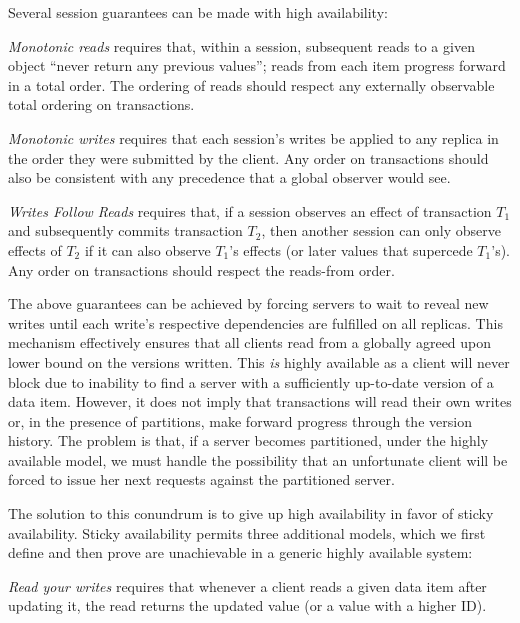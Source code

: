 Several session guarantees can be made with high availability:

\vspace{.5em}\noindent\textit{{Monotonic reads}} requires that, within
a session, subsequent reads to a given object ``never return any
previous values''; reads from each item progress forward in a total
order. The ordering of reads should respect any externally observable
total ordering on transactions.

\vspace{.5em}\noindent\textit{{Monotonic writes}} requires that each
session's writes be applied to any replica in the order they were
submitted by the client. Any order on transactions should also be
consistent with any precedence that a global observer would see.

\vspace{.5em}\noindent\textit{{Writes Follow Reads}} requires that, if
a session observes an effect of transaction $T_1$ and subsequently
commits transaction $T_2$, then another session can only observe
effects of $T_2$ if it can also observe $T_1$'s effects (or later
values that supercede $T_1$'s).  Any order on transactions should
respect the reads-from order.\vspace{.5em}

The above guarantees can be achieved by forcing servers to wait to
reveal new writes until each write's respective dependencies are
fulfilled on all replicas. This mechanism effectively ensures that all
clients read from a globally agreed upon lower bound on the versions
written. This \textit{is} highly available as a client
will never block due to inability to find a server with a sufficiently
up-to-date version of a data item. However, it does not imply that
transactions will read their own writes or, in the presence of
partitions, make forward progress through the version history. The
problem is that, if a server becomes partitioned, under the highly
available model, we must handle the possibility that an unfortunate
client will be forced to issue her next requests against the
partitioned server.

The solution to this conundrum is to give up high availability in
favor of sticky availability. Sticky availability permits three
additional models, which we first define and then prove are
unachievable in a generic highly available system:

\vspace{.5em}\noindent\textit{{Read your writes}} requires
that whenever a client reads a given data item after updating it, the
read returns the updated value (or a value with a higher ID).

